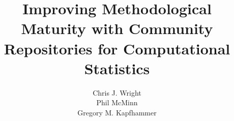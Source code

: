 \documentclass{sig-alternate}
\begin{document}


\title{Improving Methodological Maturity with Community Repositories for Computational Statistics\vspace*{-.1in}}


\author{
\alignauthor
Chris J. Wright\\
\alignauthor
Phil McMinn\\
\alignauthor
Gregory M. Kapfhammer\\
}

\maketitle





\vspace*{-.5em}

\scriptsize


\end{document}
